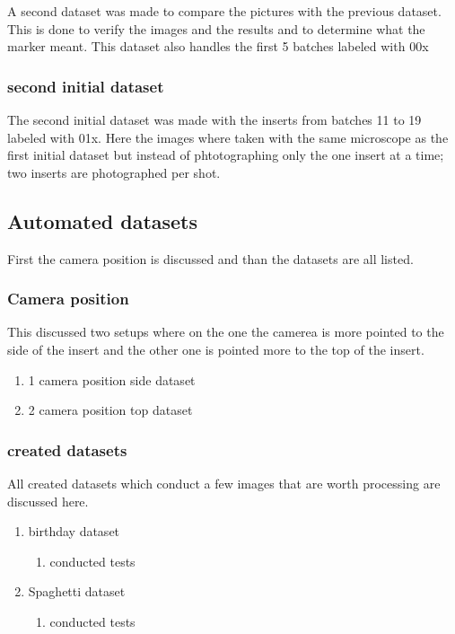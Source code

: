 	A second dataset was made to compare the pictures with the previous dataset. This is done to verify the images and the results and to determine 	what the marker meant. This dataset also handles the first 5 batches labeled with 00x
	


\subsubsection{second initial dataset}

	The second initial dataset was made with the inserts from batches 11 to 19 labeled with 01x. Here the images where taken with the same microscope as the first initial dataset but instead of phtotographing only the one insert at a time; two inserts are photographed per shot.
	


\subsection{Automated datasets}

First the camera position is discussed and than the datasets are all listed.



\subsubsection{Camera position}

	This discussed two setups where on the one the camerea is more pointed to the side of the insert and the other one is pointed more to the top of the insert.
	
	\begin{enumerate}[1]
	\item 1 camera position side dataset
	\item 2 camera position top dataset
	\end{enumerate}


\subsubsection{created datasets}

	All created datasets which conduct a few images that are worth processing are discussed here. 
	


	\begin{enumerate}[1]
	\item birthday dataset
		\begin{enumerate}[a]
		\item conducted tests
		\end{enumerate}
	\item Spaghetti dataset
		\begin{enumerate}[a]
		\item conducted tests
		\end{enumerate}
	\end{enumerate}


